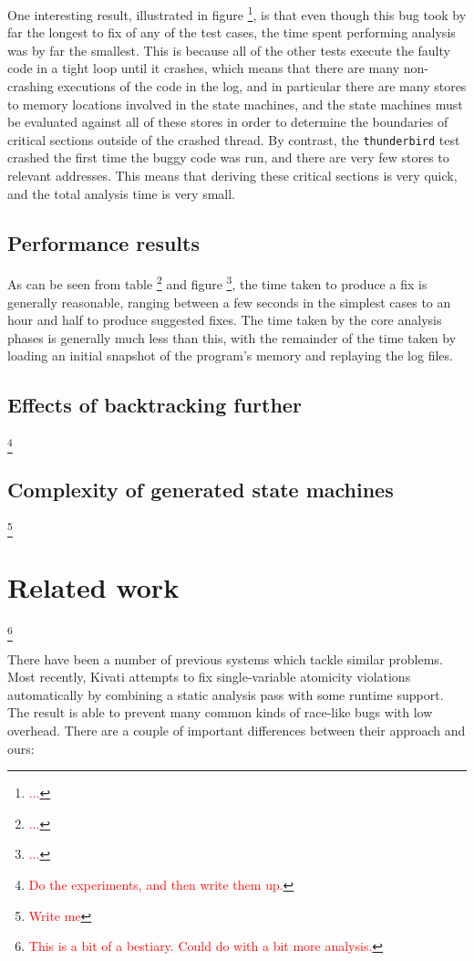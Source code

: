 \documentclass[10pt,twocolumn,preprint,natbib,authoryear]{sigplanconf}
\newcommand{\editorial}[1]{\textcolor{red}{\footnote{\textcolor{red}{#1}}}}
\begin{document}
One interesting result, illustrated in figure \editorial{...}, is that
even though this bug took by far the longest to fix of any of the test
cases, the time spent performing analysis was by far the smallest.
This is because all of the other tests execute the faulty code in a
tight loop until it crashes, which means that there are many
non-crashing executions of the code in the log, and in particular
there are many stores to memory locations involved in the state
machines, and the state machines must be evaluated against all of
these stores in order to determine the boundaries of critical sections
outside of the crashed thread.  By contrast, the \verb|thunderbird|
test crashed the first time the buggy code was run, and there are very
few stores to relevant addresses.  This means that deriving these
critical sections is very quick, and the total analysis time is very
small.

\subsection{Performance results}

As can be seen from table \editorial{...} and figure \editorial{...},
the time taken to produce a fix is generally reasonable, ranging
between a few seconds in the simplest cases to an hour and half to
produce suggested fixes.  The time taken by the core analysis phases
is generally much less than this, with the remainder of the time
taken by loading an initial snapshot of the program's memory and
replaying the log files.

\subsection{Effects of backtracking further}

\editorial{Do the experiments, and then write them up.}

\subsection{Complexity of generated state machines}

\editorial{Write me}

\section{Related work}\editorial{This is a bit of a bestiary.  Could do with a bit more analysis.}

There have been a number of previous systems which tackle similar
problems.  Most recently, Kivati\cite{Chew2010a} attempts to fix
single-variable atomicity violations automatically by combining a
static analysis pass with some runtime support.  The result is able to
prevent many common kinds of race-like bugs with low overhead.  There
are a couple of important differences between their approach and ours:
\end{document}
